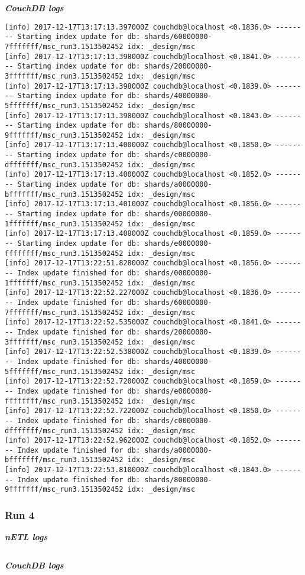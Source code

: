 \textit{\textbf{CouchDB logs}}
\begin{verbatim}
[info] 2017-12-17T13:17:13.397000Z couchdb@localhost <0.1836.0> -------- Starting index update for db: shards/60000000-7fffffff/msc_run3.1513502452 idx: _design/msc
[info] 2017-12-17T13:17:13.398000Z couchdb@localhost <0.1841.0> -------- Starting index update for db: shards/20000000-3fffffff/msc_run3.1513502452 idx: _design/msc
[info] 2017-12-17T13:17:13.398000Z couchdb@localhost <0.1839.0> -------- Starting index update for db: shards/40000000-5fffffff/msc_run3.1513502452 idx: _design/msc
[info] 2017-12-17T13:17:13.398000Z couchdb@localhost <0.1843.0> -------- Starting index update for db: shards/80000000-9fffffff/msc_run3.1513502452 idx: _design/msc
[info] 2017-12-17T13:17:13.400000Z couchdb@localhost <0.1850.0> -------- Starting index update for db: shards/c0000000-dfffffff/msc_run3.1513502452 idx: _design/msc
[info] 2017-12-17T13:17:13.400000Z couchdb@localhost <0.1852.0> -------- Starting index update for db: shards/a0000000-bfffffff/msc_run3.1513502452 idx: _design/msc
[info] 2017-12-17T13:17:13.401000Z couchdb@localhost <0.1856.0> -------- Starting index update for db: shards/00000000-1fffffff/msc_run3.1513502452 idx: _design/msc
[info] 2017-12-17T13:17:13.408000Z couchdb@localhost <0.1859.0> -------- Starting index update for db: shards/e0000000-ffffffff/msc_run3.1513502452 idx: _design/msc
[info] 2017-12-17T13:22:51.828000Z couchdb@localhost <0.1856.0> -------- Index update finished for db: shards/00000000-1fffffff/msc_run3.1513502452 idx: _design/msc
[info] 2017-12-17T13:22:52.227000Z couchdb@localhost <0.1836.0> -------- Index update finished for db: shards/60000000-7fffffff/msc_run3.1513502452 idx: _design/msc
[info] 2017-12-17T13:22:52.535000Z couchdb@localhost <0.1841.0> -------- Index update finished for db: shards/20000000-3fffffff/msc_run3.1513502452 idx: _design/msc
[info] 2017-12-17T13:22:52.538000Z couchdb@localhost <0.1839.0> -------- Index update finished for db: shards/40000000-5fffffff/msc_run3.1513502452 idx: _design/msc
[info] 2017-12-17T13:22:52.720000Z couchdb@localhost <0.1859.0> -------- Index update finished for db: shards/e0000000-ffffffff/msc_run3.1513502452 idx: _design/msc
[info] 2017-12-17T13:22:52.722000Z couchdb@localhost <0.1850.0> -------- Index update finished for db: shards/c0000000-dfffffff/msc_run3.1513502452 idx: _design/msc
[info] 2017-12-17T13:22:52.962000Z couchdb@localhost <0.1852.0> -------- Index update finished for db: shards/a0000000-bfffffff/msc_run3.1513502452 idx: _design/msc
[info] 2017-12-17T13:22:53.810000Z couchdb@localhost <0.1843.0> -------- Index update finished for db: shards/80000000-9fffffff/msc_run3.1513502452 idx: _design/msc
\end{verbatim}


\subsubsection{Run 4}
\textit{\textbf{nETL logs}}
\begin{verbatim}
\end{verbatim}

\textit{\textbf{CouchDB logs}}
\begin{verbatim}
\end{verbatim}



